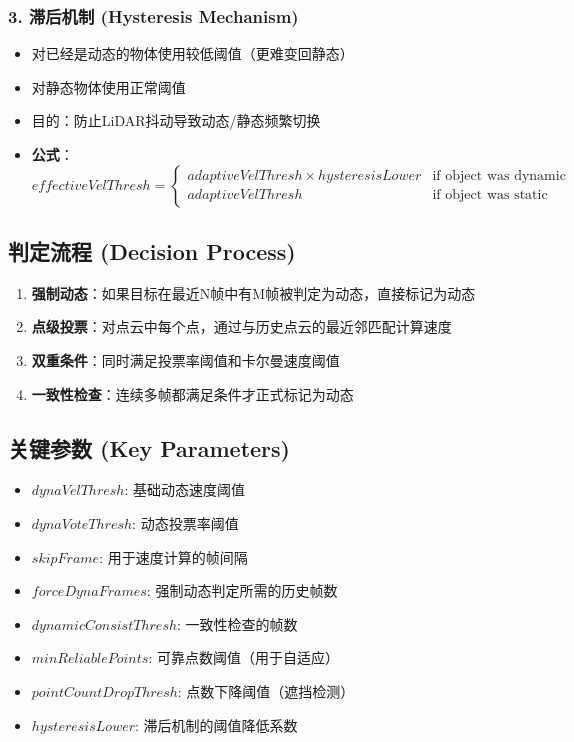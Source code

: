 \documentclass[14pt,a4paper]{article}
\begin{document}
\subsubsection*{3. 滞后机制 (Hysteresis Mechanism)}
\begin{itemize}
    \item 对已经是动态的物体使用较低阈值（更难变回静态）
    \item 对静态物体使用正常阈值
    \item 目的：防止LiDAR抖动导致动态/静态频繁切换
    \item \textbf{公式}：
    \begin{equation*}
    effectiveVelThresh = 
    \begin{cases}
    adaptiveVelThresh \times hysteresisLower & \text{if object was dynamic} \\
    adaptiveVelThresh & \text{if object was static}
    \end{cases}
    \end{equation*}
\end{itemize}

\subsection*{判定流程 (Decision Process)}

\begin{enumerate}
    \item \textbf{强制动态}：如果目标在最近N帧中有M帧被判定为动态，直接标记为动态
    \item \textbf{点级投票}：对点云中每个点，通过与历史点云的最近邻匹配计算速度
    \item \textbf{双重条件}：同时满足投票率阈值和卡尔曼速度阈值
    \item \textbf{一致性检查}：连续多帧都满足条件才正式标记为动态
\end{enumerate}

\subsection*{关键参数 (Key Parameters)}

\begin{itemize}
    \item $dynaVelThresh$: 基础动态速度阈值
    \item $dynaVoteThresh$: 动态投票率阈值
    \item $skipFrame$: 用于速度计算的帧间隔
    \item $forceDynaFrames$: 强制动态判定所需的历史帧数
    \item $dynamicConsistThresh$: 一致性检查的帧数
    \item $minReliablePoints$: 可靠点数阈值（用于自适应）
    \item $pointCountDropThresh$: 点数下降阈值（遮挡检测）
    \item $hysteresisLower$: 滞后机制的阈值降低系数
\end{itemize}
\end{document}
